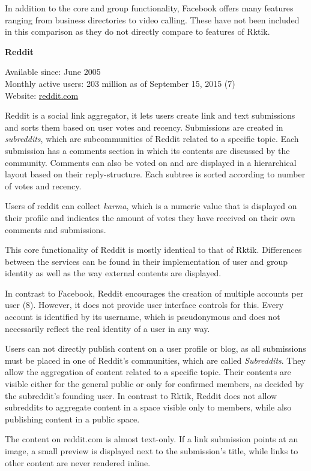 In addition to the core and group functionality, Facebook offers many
features ranging from business directories to video calling. These have
not been included in this comparison as they do not directly compare to
features of Rktik.

\textbf{Reddit}

Available since: June 2005\\
Monthly active users: 203 million as of September 15, 2015 (7)\\
Website: \href{https://reddit.com}{reddit.com}

Reddit is a social link aggregator, it lets users create link and text
submissions and sorts them based on user votes and recency. Submissions
are created in \emph{subreddits}, which are subcommunities of Reddit
related to a specific topic. Each submission has a comments section in
which its contents are discussed by the community. Comments can also be
voted on and are displayed in a hierarchical layout based on their
reply-structure. Each subtree is sorted according to number of votes and
recency.

Users of reddit can collect \emph{karma}, which is a numeric value that
is displayed on their profile and indicates the amount of votes they
have received on their own comments and submissions.

This core functionality of Reddit is mostly identical to that of Rktik.
Differences between the services can be found in their implementation of
user and group identity as well as the way external contents are
displayed.

In contrast to Facebook, Reddit encourages the creation of multiple
accounts per user (8). However, it does not provide user interface
controls for this. Every account is identified by its username, which is
pseudonymous and does not necessarily reflect the real identity of a
user in any way.

Users can not directly publish content on a user profile or blog, as all
submissions must be placed in one of Reddit's communities, which are
called \emph{Subreddits}. They allow the aggregation of content related
to a specific topic. Their contents are visible either for the general
public or only for confirmed members, as decided by the subreddit's
founding user. In contrast to Rktik, Reddit does not allow subreddits to
aggregate content in a space visible only to members, while also
publishing content in a public space.

The content on reddit.com is almost text-only. If a link submission
points at an image, a small preview is displayed next to the
submission's title, while links to other content are never rendered
inline.

